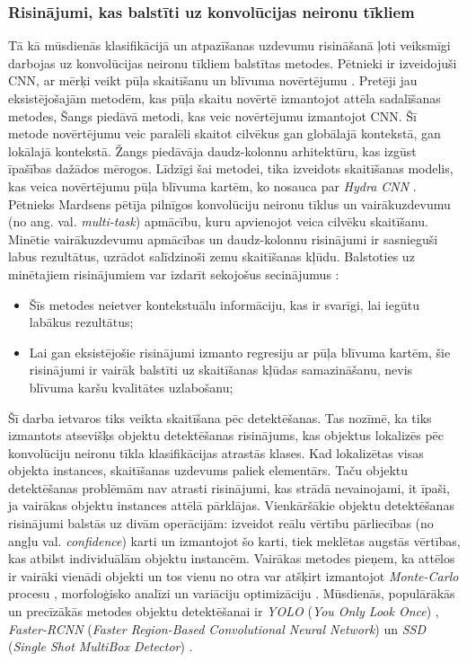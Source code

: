 \subsubsection{Risinājumi, kas balstīti uz konvolūcijas neironu tīkliem}
Tā kā mūsdienās klasifikācijā un atpazīšanas uzdevumu risināšanā ļoti veiksmīgi darbojas uz konvolūcijas neironu tīkliem balstītas metodes. Pētnieki ir izveidojuši CNN, ar mērķi veikt pūļa skaitīšanu un blīvuma novērtējumu \cite{wang2015deep,shang2016end,walach2016learning}. Pretēji jau eksistējošajām metodēm, kas pūļa skaitu novērtē izmantojot attēla sadalīšanas metodes, Šangs \cite{shang2016end} piedāvā metodi, kas veic novērtējumu izmantojot CNN. Šī metode novērtējumu veic paralēli skaitot cilvēkus gan globālajā kontekstā, gan lokālajā kontekstā. Žangs \cite{zhang2016single} piedāvāja daudz-kolonnu arhitektūru, kas izgūst īpašības dažādos mērogos. Līdzīgi šai metodei, tika izveidots skaitīšanas modelis, kas veica novērtējumu pūļa blīvuma kartēm, ko nosauca par \textit{Hydra CNN} \cite{onoro2016towards}. Pētnieks Mardsens \cite{marsden2017resnetcrowd} pētīja pilnīgos konvolūciju neironu tīklus un vairākuzdevumu (no ang. val. \textit{multi-task}) apmācību, kuru apvienojot veica cilvēku skaitīšanu. Minētie vairākuzdevumu apmācības un daudz-kolonnu risinājumi ir sasnieguši labus rezultātus, uzrādot salīdzinoši zemu skaitīšanas kļūdu. Balstoties uz minētajiem risinājumiem var izdarīt sekojošus secinājumus \cite{sindagi2017generating}:
\begin{itemize}
	\item Šīs metodes neietver kontekstuālu informāciju, kas ir svarīgi, lai iegūtu labākus rezultātus;
	\item Lai gan eksistējošie risinājumi izmanto regresiju ar pūļa blīvuma kartēm, šie risinājumi ir vairāk balstīti uz skaitīšanas kļūdas samazināšanu, nevis blīvuma karšu kvalitātes uzlabošanu;
\end{itemize}
\newpage
Šī darba ietvaros tiks veikta skaitīšana pēc detektēšanas. Tas nozīmē, ka tiks izmantots atsevišķs objektu detektēšanas risinājums, kas objektus lokalizēs pēc konvolūciju neironu tīkla klasifikācijas atrastās klases. Kad lokalizētas visas objekta instances, skaitīšanas uzdevums paliek elementārs. Taču objektu detektēšanas problēmām nav atrasti risinājumi, kas strādā nevainojami, it īpaši, ja vairākas objektu instances attēlā pārklājas. Vienkāršākie objektu detektēšanas risinājumi balstās uz divām operācijām: izveidot reālu vērtību pārliecības (no angļu val. \textit{confidence}) karti un izmantojot šo karti, tiek meklētas augstās vērtības, kas atbilst individuālām objektu instancēm. Vairākas metodes pieņem, ka attēlos ir vairāki vienādi objekti un tos vienu no otra var atšķirt izmantojot \textit{Monte-Carlo} procesu \cite{descombes2009object}, morfoloģisko analīzi \cite{selinummi2005software} un variāciju optimizāciju \cite{nath2006cell}. Mūsdienās, populārākās un precīzākās metodes objektu detektēšanai ir \textit{YOLO} (\textit{You Only Look Once}) \cite{redmon2016you}, \textit{Faster-RCNN} (\textit{Faster Region-Based Convolutional Neural Network}) \cite{ren2015faster} un \textit{SSD} (\textit{Single Shot MultiBox Detector}) \cite{liu2016ssd}.
